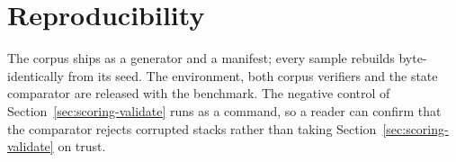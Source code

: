 \section{Reproducibility}
\label{sec:reproducibility}

The corpus ships as a generator and a manifest; every sample rebuilds byte-identically from its
seed. The environment, both corpus verifiers and the state comparator are released with the
benchmark. The negative control of Section~\ref{sec:scoring-validate} runs as a command, so a
reader can confirm that the comparator rejects corrupted stacks rather than taking
Section~\ref{sec:scoring-validate} on trust.

